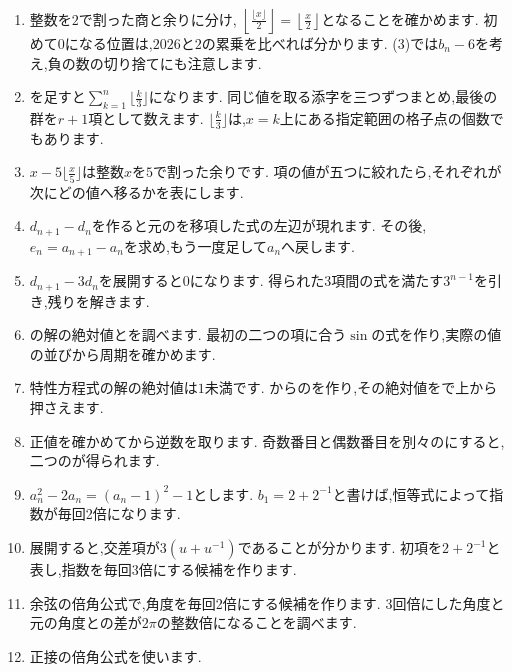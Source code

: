 \begin{enumerate}[label=\textbf{問\arabic*.},leftmargin=3.8em,format=\bookitemlink{practice-special}{hint}{answer}]
  \item 整数を$2$で割った商と余りに分け,
    $\left\lfloor\frac{\lfloor x\rfloor}{2}\right\rfloor
      =\left\lfloor\frac{x}{2}\right\rfloor$となることを確かめます.
    初めて$0$になる位置は,$2026$と$2$の累乗を比べれば分かります.
    (3)では$b_n-6$を考え,負の数の切り捨てにも注意します.
  \item {}を足すと$\sum_{k=1}^{n}\lfloor\frac{k}{3}\rfloor$になります.
    同じ値を取る添字を三つずつまとめ,最後の群を$r+1$項として数えます.
    $\lfloor\frac{k}{3}\rfloor$は,$x=k$上にある指定範囲の格子点の個数でもあります.
  \item $x-5\lfloor\frac{x}{5}\rfloor$は整数$x$を$5$で割った余りです.
    項の値が五つに絞れたら,それぞれが次にどの値へ移るかを表にします.
  \item $d_{n+1}-d_n$を作ると元のを移項した式の左辺が現れます.
    その後,$e_n=a_{n+1}-a_n$を求め,もう一度足して$a_n$へ戻します.
  \item $d_{n+1}-3d_n$を展開すると$0$になります.
    得られた3項間の式を満たす$3^{n-1}$を引き,残りを解きます.
  \item {}の解の絶対値とを調べます.
    最初の二つの項に合う$\sin$の式を作り,実際の値の並びから周期を確かめます.
  \item 特性方程式の解の絶対値は$1$未満です.
    からのを作り,その絶対値をで上から押さえます.
  \item 正値を確かめてから逆数を取ります.
    奇数番目と偶数番目を別々のにすると,二つのが得られます.
  \item $a_n^2-2a_n=(a_n-1)^2-1$とします.
    $b_1=2+2^{-1}$と書けば,恒等式によって指数が毎回2倍になります.
  \item 展開すると,交差項が$3(u+u^{-1})$であることが分かります.
    初項を$2+2^{-1}$と表し,指数を毎回3倍にする候補を作ります.
  \item 余弦の倍角公式で,角度を毎回2倍にする候補を作ります.
    3回倍にした角度と元の角度との差が$2\pi$の整数倍になることを調べます.
  \item 正接の倍角公式を使います.

\end{enumerate}
